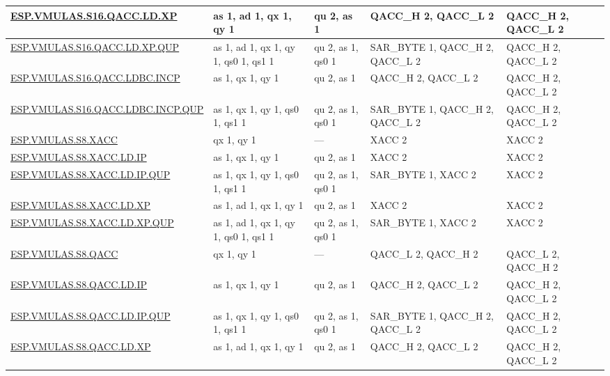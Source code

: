 \begin{longtable}[c]{|l|m{2.5cm}|m{2.5cm}|m{2.5cm}|m{2.5cm}|}
    \hyperref[instruction:ESPVMULASS16QACCLDXP]{ESP.VMULAS.S16.QACC.LD.XP} & as 1, ad 1, qx 1, qy 1 & qu 2, as 1 & QACC\_H 2, QACC\_L 2 & QACC\_H 2, QACC\_L 2\\\hline
    \hyperref[instruction:ESPVMULASS16QACCLDXPQUP]{ESP.VMULAS.S16.QACC.LD.XP.QUP} & as 1, ad 1, qx 1, qy 1, qs0 1, qs1 1 & qu 2, as 1, qs0 1 & SAR\_BYTE 1, QACC\_H 2, QACC\_L 2 & QACC\_H 2, QACC\_L 2\\\hline
    \hyperref[instruction:ESPVMULASS16QACCLDBCINCP]{ESP.VMULAS.S16.QACC.LDBC.INCP} & as 1, qx 1, qy 1 & qu 2, as 1 & QACC\_H 2, QACC\_L 2 & QACC\_H 2, QACC\_L 2\\\hline
    \hyperref[instruction:ESPVMULASS16QACCLDBCINCPQUP]{ESP.VMULAS.S16.QACC.LDBC.INCP.QUP} & as 1, qx 1, qy 1, qs0 1, qs1 1 & qu 2, as 1, qs0 1 & SAR\_BYTE 1, QACC\_H 2, QACC\_L 2 & QACC\_H 2, QACC\_L 2\\\hline
    \hyperref[instruction:ESPVMULASS8XACC]{ESP.VMULAS.S8.XACC} & qx 1, qy 1 & — & XACC 2 & XACC 2\\\hline
    \hyperref[instruction:ESPVMULASS8XACCLDIP]{ESP.VMULAS.S8.XACC.LD.IP} & as 1, qx 1, qy 1 & qu 2, as 1 & XACC 2 & XACC 2\\\hline
    \hyperref[instruction:ESPVMULASS8XACCLDIPQUP]{ESP.VMULAS.S8.XACC.LD.IP.QUP} & as 1, qx 1, qy 1, qs0 1, qs1 1 & qu 2, as 1, qs0 1 & SAR\_BYTE 1, XACC 2 & XACC 2\\\hline
    \hyperref[instruction:ESPVMULASS8XACCLDXP]{ESP.VMULAS.S8.XACC.LD.XP} & as 1, ad 1, qx 1, qy 1 & qu 2, as 1 & XACC 2 & XACC 2\\\hline
    \hyperref[instruction:ESPVMULASS8XACCLDXPQUP]{ESP.VMULAS.S8.XACC.LD.XP.QUP} & as 1, ad 1, qx 1, qy 1, qs0 1, qs1 1 & qu 2, as 1, qs0 1 & SAR\_BYTE 1, XACC 2 & XACC 2\\\hline
    \hyperref[instruction:ESPVMULASS8QACC]{ESP.VMULAS.S8.QACC} & qx 1, qy 1 & — & QACC\_L 2, QACC\_H 2 & QACC\_L 2, QACC\_H 2\\\hline
    \hyperref[instruction:ESPVMULASS8QACCLDIP]{ESP.VMULAS.S8.QACC.LD.IP} & as 1, qx 1, qy 1 & qu 2, as 1 & QACC\_H 2, QACC\_L 2 & QACC\_H 2, QACC\_L 2\\\hline
    \hyperref[instruction:ESPVMULASS8QACCLDIPQUP]{ESP.VMULAS.S8.QACC.LD.IP.QUP} & as 1, qx 1, qy 1, qs0 1, qs1 1 & qu 2, as 1, qs0 1 & SAR\_BYTE 1, QACC\_H 2, QACC\_L 2 & QACC\_H 2, QACC\_L 2\\\hline
    \hyperref[instruction:ESPVMULASS8QACCLDXP]{ESP.VMULAS.S8.QACC.LD.XP} & as 1, ad 1, qx 1, qy 1 & qu 2, as 1 & QACC\_H 2, QACC\_L 2 & QACC\_H 2, QACC\_L 2\\\hline

\end{longtable}
